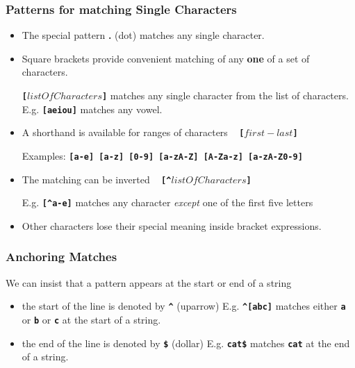 \begin{frame}[shrink]
\frametitle{Patterns for matching Single Characters}

\begin{itemize}
\item
The special pattern {\bf{.}} (dot) matches any single character.

\item
Square brackets provide convenient matching of any {\bf one} of a set of characters.

{\bf{\textbf{\tt{[}}}}$listOfCharacters${\bf{\textbf{\tt{]}}}}
matches any single character from the list of characters.  E.g. \textbf{\tt{[aeiou]}} matches any vowel.

\item
A shorthand is available for ranges of characters ~ {\bf{\textbf{\tt{[}}}}$first-last${\bf{\textbf{\tt{]}}}}

Examples: \textbf{\tt{[a-e]  [a-z]  [0-9]  [a-zA-Z]  [A-Za-z]  [a-zA-Z0-9] }}

\item
The matching can be inverted ~ {\bf{\textbf{\tt{[{\textasciicircum}}}}}$listOfCharacters${\bf{\textbf{\tt{]}}}}

E.g. \textbf{\tt{[{\textasciicircum}a-e]}} matches any character {\it{except}} one of the first five letters

\item
{\small Other characters  lose their special meaning inside bracket expressions.}
\end{itemize}
\end{frame}

\begin{frame}
\frametitle{Anchoring Matches}
We can insist that a pattern appears at the start or end of a string

\begin{itemize}
\item  the start of the line is denoted by {\bf{\textbf{\tt{{\textasciicircum}}}}} (uparrow)
E.g. \textbf{\tt{{\textasciicircum}[abc]}} matches either \textbf{\tt{a}} or \textbf{\tt{b}} or \textbf{\tt{c}} at the
start of a string.
\item  the end of the line is denoted by {\bf{\textbf{\tt{\$}}}} (dollar)
E.g. \textbf{\tt{cat\$}} matches \textbf{\tt{cat}} at the end of a string.
\end{itemize}
\end{frame}


